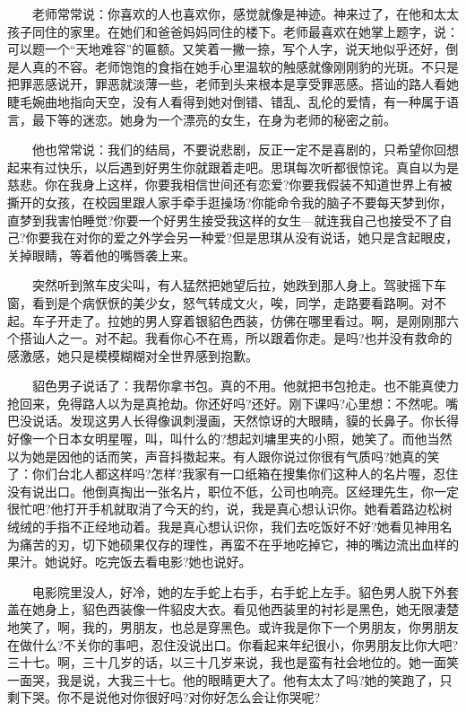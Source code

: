 \documentclass[12pt,UTF8]{ctexbook}
\begin{document}
　　老师常常说：你喜欢的人也喜欢你，感觉就像是神迹。神来过了，在他和太太孩子同住的家里。在她们和爸爸妈妈同住的楼下。老师最喜欢在她掌上题字，说：可以题一个\enquote{天地难容}的匾额。又笑着一撇一捺，写个人字，说天地似乎还好，倒是人真的不容。老师饱饱的食指在她手心里温软的触感就像刚刚豹的光斑。不只是把罪恶感说开，罪恶就淡薄一些，老师到头来根本是享受罪恶感。搭讪的路人看她睫毛婉曲地指向天空，没有人看得到她对倒错、错乱、乱伦的爱情，有一种属于语言，最下等的迷恋。她身为一个漂亮的女生，在身为老师的秘密之前。

　　他也常常说：我们的结局，不要说悲剧，反正一定不是喜剧的，只希望你回想起来有过快乐，以后遇到好男生你就跟着走吧。思琪每次听都很惊诧。真自以为是慈悲。你在我身上这样，你要我相信世间还有恋爱?你要我假装不知道世界上有被撕开的女孩，在校园里跟人家手牵手逛操场?你能命令我的脑子不要每天梦到你，直梦到我害怕睡觉?你要一个好男生接受我这样的女生---就连我自己也接受不了自己?你要我在对你的爱之外学会另一种爱?但是思琪从没有说话，她只是含起眼皮，关掉眼睛，等着他的嘴唇袭上来。

　　突然听到煞车皮尖叫，有人猛然把她望后拉，她跌到那人身上。驾驶摇下车窗，看到是个病恹恹的美少女，怒气转成文火，唉，同学，走路要看路啊。对不起。车子开走了。拉她的男人穿着银貂色西装，仿佛在哪里看过。啊，是刚刚那六个搭讪人之一。对不起。我看你心不在焉，所以跟着你走。是吗?也并没有救命的感激感，她只是模模糊糊对全世界感到抱歉。

　　貂色男子说话了：我帮你拿书包。真的不用。他就把书包抢走。也不能真使力抢回来，免得路人以为是真抢劫。你还好吗?还好。刚下课吗?心里想：不然呢。嘴巴没说话。发现这男人长得像讽刺漫画，天然惊讶的大眼睛，貘的长鼻子。你长得好像一个日本女明星喔，叫，叫什么的?想起刘墉里夹的小照，她笑了。而他当然以为她是因他的话而笑，声音抖擞起来。有人跟你说过你很有气质吗?她真的笑了：你们台北人都这样吗?怎样?我家有一口纸箱在搜集你们这种人的名片喔，忍住没有说出口。他倒真掏出一张名片，职位不低，公司也响亮。区经理先生，你一定很忙吧?他打开手机就取消了今天的约，说，我是真心想认识你。她看着路边松树绒绒的手指不正经地动着。我是真心想认识你，我们去吃饭好不好?她看见神用名为痛苦的刃，切下她硕果仅存的理性，再蛮不在乎地吃掉它，神的嘴边流出血样的果汁。她说好。吃完饭去看电影?她也说好。

　　电影院里没人，好冷，她的左手蛇上右手，右手蛇上左手。貂色男人脱下外套盖在她身上，貂色西装像一件貂皮大衣。看见他西装里的衬衫是黑色，她无限凄楚地笑了，啊，我的，男朋友，也总是穿黑色。或许我是你下一个男朋友，你男朋友在做什么?不关你的事吧，忍住没说出口。你看起来年纪很小，你男朋友比你大吧?三十七。啊，三十几岁的话，以三十几岁来说，我也是蛮有社会地位的。她一面笑一面哭，我是说，大我三十七。他的眼睛更大了。他有太太了吗?她的笑跑了，只剩下哭。你不是说他对你很好吗?对你好怎么会让你哭呢?
\end{document}
